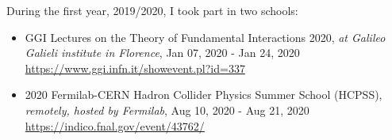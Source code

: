 During the first year, 2019/2020, I took part in two schools:

\begin{itemize}
    \item GGI Lectures on the Theory of Fundamental Interactions 2020,
        \textit{at Galileo Galieli institute in Florence}, Jan 07, 2020 - Jan
        24, 2020 \url{https://www.ggi.infn.it/showevent.pl?id=337}
    \item 2020 Fermilab-CERN Hadron Collider Physics Summer School (HCPSS),
        \textit{remotely, hosted by Fermilab}, Aug 10, 2020 - Aug 21, 2020
        \url{https://indico.fnal.gov/event/43762/}
\end{itemize}
